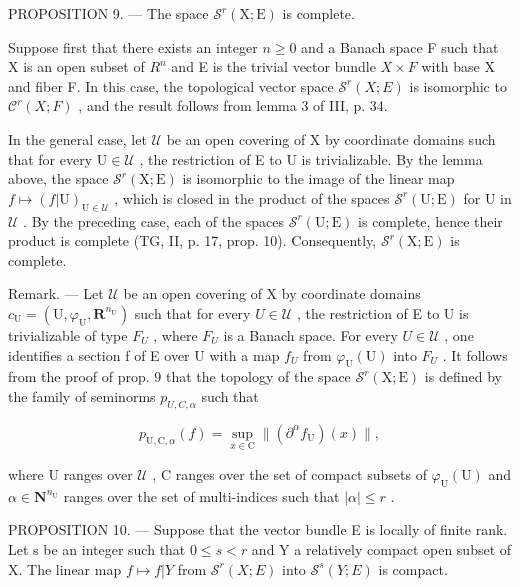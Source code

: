 PROPOSITION 9. --- The space \(\mathcal{S}^r(\mathrm{X};\mathrm{E})\) is complete.

Suppose first that there exists an integer \(n \geqslant 0\) and a Banach space F such that X is an open subset of \(R^{n}\) and E is the trivial vector bundle \(X \times F\) with base X and fiber F. In this case, the topological vector space \(\mathcal{S}^{r}(X;E)\) is isomorphic to \(\mathcal{C}^{r}(X;F)\) , and the result follows from lemma 3 of III, p. 34.

In the general case, let \(\mathcal{U}\) be an open covering of X by coordinate domains such that for every \(\mathrm{U} \in \mathcal{U}\) , the restriction of E to U is trivializable. By the lemma above, the space \(\mathcal{S}^r(\mathrm{X};\mathrm{E})\) is isomorphic to the image of the linear map \(f \mapsto (f|\mathrm{U})_{\mathrm{U} \in \mathcal{U}}\) , which is closed in the product of the spaces \(\mathcal{S}^r(\mathrm{U};\mathrm{E})\) for U in \(\mathcal{U}\) . By the preceding case, each of the spaces \(\mathcal{S}^r(\mathrm{U};\mathrm{E})\) is complete, hence their product is complete (TG, II, p. 17, prop. 10). Consequently, \(\mathcal{S}^r(\mathrm{X};\mathrm{E})\) is complete.

Remark. --- Let \(\mathcal{U}\) be an open covering of X by coordinate domains \(c_{\mathrm{U}} = (\mathrm{U}, \varphi_{\mathrm{U}}, \mathbf{R}^{n_{\mathrm{U}}})\) such that for every \(U \in \mathcal{U}\) , the restriction of E to U is trivializable of type \(F_{U}\) , where \(F_{U}\) is a Banach space. For every \(U \in \mathcal{U}\) , one identifies a section f of E over U with a map \(f_{U}\) from \(\varphi_{\mathrm{U}}(\mathrm{U})\) into \(F_{U}\) . It follows from the proof of prop. 9 that the topology of the space \(\mathcal{S}^{r}(\mathrm{X};\mathrm{E})\) is defined by the family of seminorms \(p_{U,C,\alpha}\) such that

\[
p _ {\mathrm{U,C}, \alpha} (f) = \sup _ {x \in \mathrm{C}} \| (\partial^ {\alpha} f _ {\mathrm{U}}) (x) \|,
\]

where U ranges over \(\mathcal{U}\) , C ranges over the set of compact subsets of \(\varphi_{\mathrm{U}}(\mathrm{U})\) and \(\alpha \in \mathbf{N}^{n_{\mathrm{U}}}\) ranges over the set of multi-indices such that \(|\alpha| \leqslant r\) .

PROPOSITION 10. --- Suppose that the vector bundle E is locally of finite rank. Let s be an integer such that \(0 \leqslant s < r\) and Y a relatively compact open subset of X. The linear map \(f \mapsto f|Y\) from \(\mathcal{S}^{r}(X;E)\) into \(\mathcal{S}^{s}(Y;E)\) is compact.

